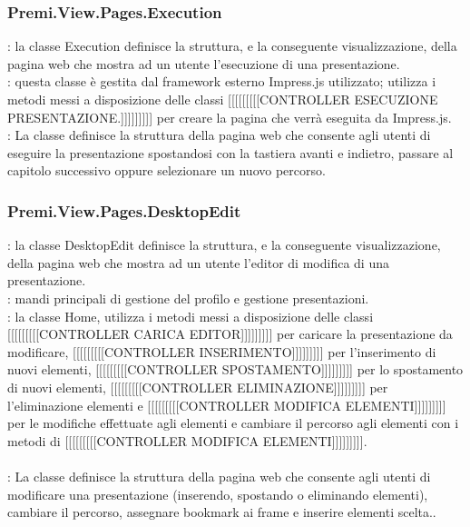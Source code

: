 {		\subsubsection{Premi.View.Pages.Execution}{
			\textbf{\tipo}: la classe Execution definisce la struttura, e la conseguente visualizzazione, della pagina web che mostra ad un utente l'esecuzione di una presentazione.\\
			\textbf{\relaz}: questa classe è gestita dal framework esterno Impress.js utilizzato; utilizza i metodi messi a disposizione delle classi [[[[[[[[[CONTROLLER ESECUZIONE PRESENTAZIONE.]]]]]]]]] per creare la pagina che verrà eseguita da Impress.js.\\
			\textbf{\attivita}: La classe definisce la struttura della pagina web che consente agli utenti di eseguire la presentazione spostandosi con la tastiera avanti e indietro, passare al capitolo successivo oppure selezionare un nuovo percorso.\\
		}
		\subsubsection{Premi.View.Pages.DesktopEdit}{
			\textbf{\tipo}: la classe DesktopEdit definisce la struttura, e la conseguente visualizzazione, della pagina web che mostra ad un utente l'editor di modifica di una presentazione.\\
			\textbf{\relaz}: mandi principali di gestione del profilo e gestione presentazioni.\\	
			\textbf{\relaz}: la classe Home, utilizza i metodi messi a disposizione delle classi [[[[[[[[[CONTROLLER CARICA EDITOR]]]]]]]]] per caricare la presentazione da modificare, [[[[[[[[[CONTROLLER INSERIMENTO]]]]]]]]] per l'inserimento di nuovi elementi, [[[[[[[[[CONTROLLER SPOSTAMENTO]]]]]]]]] per lo spostamento di nuovi elementi, [[[[[[[[[CONTROLLER ELIMINAZIONE]]]]]]]]] per l'eliminazione elementi e [[[[[[[[[CONTROLLER MODIFICA ELEMENTI]]]]]]]]] per le modifiche effettuate agli elementi e cambiare il percorso agli elementi con i metodi di [[[[[[[[[CONTROLLER MODIFICA ELEMENTI]]]]]]]]].\\\\
			\textbf{\attivita}: La classe definisce la struttura della pagina web che consente agli utenti di modificare una presentazione (inserendo, spostando o eliminando elementi), cambiare il percorso, assegnare bookmark ai frame e inserire elementi scelta..\\
		}
}
